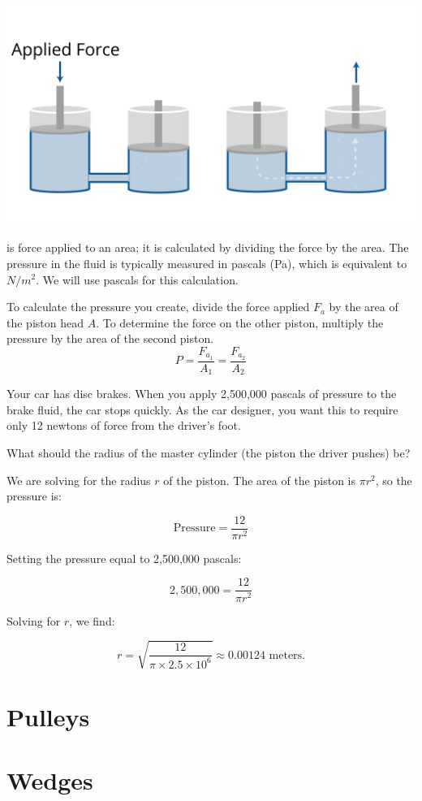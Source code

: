 \includegraphics[width=\textwidth]{hydraulicsNew.png}

 is force applied to an area; it is calculated by dividing 
the force by the area.  The pressure in the fluid is typically measured in 
pascals (Pa), which is equivalent to \(N / m^2\). We will use pascals for this 
calculation.

To calculate the pressure you create, divide the force applied $F_{a}$ by the 
area of the piston head $A$. To determine the force on the other piston, 
multiply the pressure by the area of the second piston.
\[
P = \frac{F_{a_1}}{A_1} = \frac{F_{a_2}}{A_2}
\]


\begin{Exercise}[title={Hydraulics}, label=hydraulics]
Your car has disc brakes. When you apply 2,500,000 pascals of pressure to the 
brake fluid, the car stops quickly. As the car designer, you want this to 
require only 12 newtons of force from the driver's foot.

What should the radius of the master cylinder (the piston the driver pushes) be?
\end{Exercise}
\begin{Answer}[ref=hydraulics]
We are solving for the radius \( r \) of the piston. The area of the piston is 
\( \pi r^2 \), so the pressure is:

\[
\text{Pressure} = \frac{12}{\pi r^2}
\]

Setting the pressure equal to 2,500,000 pascals:

\[
2,500,000 = \frac{12}{\pi r^2}
\]

Solving for \( r \), we find:

\[
r = \sqrt{\frac{12}{\pi \times 2.5 \times 10^6}} \approx 0.00124 \text{ meters}.
\]
\end{Answer}

\section{Pulleys}

\section{Wedges}
